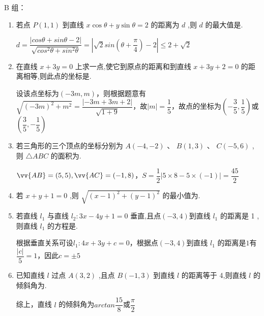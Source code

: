 B 组：
\begin{enumerate}
    \item 若点 $P\left( {1,1}\right)$ 到直线 $x\cos \theta  + y\sin \theta  = 2$ 的距离为 $d$ ,则 $d$ 的最大值是.
    \begin{jieda}
        $d = \dfrac{|cos\theta + sin\theta - 2|}{\sqrt{cos^2\theta + sin^2\theta}}  = \left|\sqrt{2}sin\left(\theta+\dfrac{\pi}{4}\right) - 2\right| \leq 2 + \sqrt{2}$
    \end{jieda}
    
    \item 在直线 $x + {3y} = 0$ 上求一点,使它到原点的距离和到直线 $x + {3y} + 2 = 0$ 的距离相等,则此点的坐标是.
    \begin{jieda}
        设该点坐标为$(-3m, m)$，则根据题意有$\sqrt{(-3m)^2+m^2} = \dfrac{|-3m + 3m + 2|}{\sqrt{1+9}}$，故$|m| = \dfrac{1}{5}$，故点的坐标为$\left(-\dfrac{3}{5}, \dfrac{1}{5}\right)$或$\left(\dfrac{3}{5}, -\dfrac{1}{5}\right)$
    \end{jieda}
    
    \item 若三角形的三个顶点的坐标分别为 $A\left( {-4, - 2}\right)$ 、 $B\left( {1,3}\right)$ 、 $C\left( {-5,6}\right)$ ,则 $\bigtriangleup  {ABC}$ 的面积为.
    \begin{jieda}
        $\vv{AB} = (5,5), \vv{AC} = (-1, 8)$，$S = \dfrac{1}{2} |5\times8 - 5 \times (-1)| = \dfrac{45}{2}$
    \end{jieda}
    
    \item 若 $x + y + 1 = 0$ ,则 $\sqrt{{\left( x - 1\right) }^{2} + {\left( y - 1\right) }^{2}}$ 的最小值为.
    
    \item 若直线 ${l}_{1}$ 与直线 ${l}_{2} : {3x} - {4y} + 1 = 0$ 垂直,且点$(-3,4)$到直线 ${l}_{1}$ 的距离是 1 ,则直线 ${l}_{1}$ 的方程是.
    \begin{jieda}
        根据垂直关系可设$l_1 : 4x+3y + c = 0$，根据点$(-3,4)$到直线 ${l}_{1}$ 的距离是$1$有$\dfrac{|c|}{5} = 1$，因此$c = \pm 5$
    \end{jieda}
    
    \item 已知直线 $l$ 过点 $A\left( {3,2}\right)$ ,且点 $B\left( {-1,3}\right)$ 到直线 $l$ 的距离等于 4,则直线 $l$ 的倾斜角为.
    \begin{jieda}
        综上，直线 $l$ 的倾斜角为$arctan \dfrac{15}{8}$或$\dfrac{\pi}{2}$
    \end{jieda}
    

\end{enumerate}
